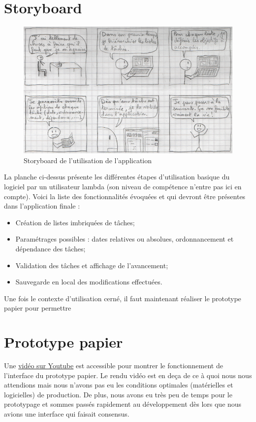 	\section{Storyboard}
		\begin{figure}[h!]
		   \includegraphics{img/stotyboard_ihm.png}
		   \caption{Storyboard de l'utilisation de l'application}
		\end{figure}
	
		La planche ci-dessus présente les différentes étapes d'utilisation basique du logiciel par un utilisateur lambda (son niveau de compétence n'entre pas ici en compte). Voici la liste des fonctionnalités évoquées et qui devront être présentes dans l'application finale :
		\begin{itemize}
			\item Création de listes imbriquées de tâches;
			\item Paramétrages possibles : dates relatives ou absolues, ordonnancement et dépendance des tâches;
			\item Validation des tâches et affichage de l'avancement;
			\item Sauvegarde en local des modifications effectuées.
		\end{itemize}
		
		Une fois le contexte d'utilisation cerné, il faut maintenant réaliser le prototype papier pour permettre
	
	\section{Prototype papier}
	Une \href{https://www.youtube.com/watch?v=xbLaZvgkzjQ}{vidéo sur Youtube} est accessible pour montrer le fonctionnement de l'interface du prototype papier. Le rendu vidéo est en deça de ce à quoi nous nous attendions mais nous n'avons pas eu les conditions optimales (matérielles et logicielles) de production. De plus, nous avons eu très peu de temps pour le prototypage et sommes passés rapidement au développement dès lors que nous avions une interface qui faisait consensus.
	
